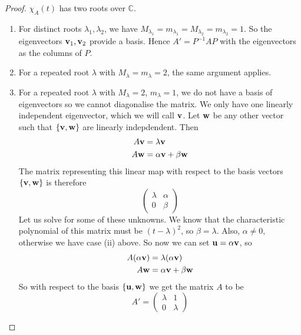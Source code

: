 \begin{proof}
	\(\chi_A(t)\) has two roots over \(\mathbb C\).
	\begin{enumerate}
		\item For distinct roots \(\lambda_1, \lambda_2\), we have \(M_{\lambda_1} = m_{\lambda_1} = M_{\lambda_2} = m_{\lambda_2} = 1\).
		      So the eigenvectors \(\vb v_1, \vb v_2\) provide a basis.
		      Hence \(A' = P^{-1}AP\) with the eigenvectors as the columns of \(P\).
		\item For a repeated root \(\lambda\) with \(M_\lambda = m_\lambda = 2\), the same argument applies.
		\item For a repeated root \(\lambda\) with \(M_\lambda = 2\), \(m_\lambda = 1\), we do not have a basis of eigenvectors so we cannot diagonalise the matrix.
		      We only have one linearly independent eigenvector, which we will call \(\vb v\).
		      Let \(\vb w\) be any other vector such that \(\{ \vb v, \vb w \}\) are linearly indepdendent.
		      Then
		      \begin{align*}
			      A\vb v & = \lambda \vb v              \\
			      A\vb w & = \alpha \vb v + \beta \vb w
		      \end{align*}
		      The matrix representing this linear map with respect to the basis vectors \(\{ \vb v, \vb w \}\) is therefore
		      \[
			      \begin{pmatrix}
				      \lambda & \alpha \\
				      0       & \beta
			      \end{pmatrix}
		      \]
		      Let us solve for some of these unknowns.
		      We know that the characteristic polynomial of this matrix must be \((t - \lambda)^2\), so \(\beta = \lambda\).
		      Also, \(\alpha \neq 0\), otherwise we have case (ii) above.
		      So now we can set \(\vb u = \alpha \vb v\), so
		      \begin{align*}
			      A(\alpha \vb v) & = \lambda (\alpha \vb v)     \\
			      A\vb w          & = \alpha \vb v + \beta \vb w
		      \end{align*}
		      So with respect to the basis \(\{ \vb u, \vb w \}\) we get the matrix \(A\) to be
		      \[
			      A' = \begin{pmatrix}
				      \lambda & 1       \\
				      0       & \lambda
			      \end{pmatrix}
		      \]
	\end{enumerate}
\end{proof}
